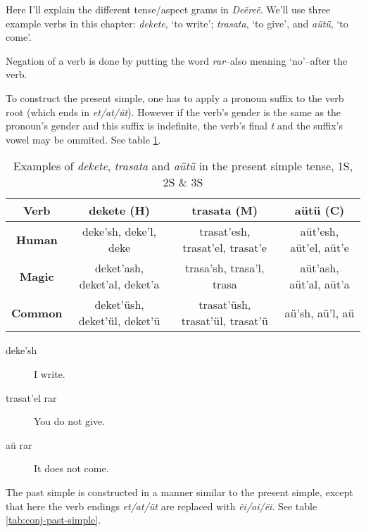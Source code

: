 Here I’ll explain the different tense/aspect grams in \emph{Deẽreẽ}. We’ll use three example verbs in this chapter: \emph{dekete}, ‘to write’; \emph{trasata}, ‘to give’, and \emph{aütü}, ‘to come’.

Negation of a verb is done by putting the word \emph{rar}–also meaning ‘no’–after the verb.

To construct the present simple, one has to apply a pronoun suffix to the verb root (which ends in \emph{et/at/üt}).
However if the verb’s gender is the same as the pronoun’s gender and this suffix is indefinite,
the verb’s final \emph{t} and the suffix’s vowel may be ommited.
See table \ref{tab:conj-present-simple}.

\begin{table}[h]
\begin{center}
\begin{tabular}{|c|c|c|c|}\hline

\textbf{Verb}   & dekete (H) & trasata (M) & aütü (C) \\\hline
\textbf{Human}  & deke’sh, deke’l, deke & trasat’esh, trasat’el, trasat’e & aüt’esh, aüt’el, aüt’e \\\hline
\textbf{Magic}  & deket’ash, deket’al, deket’a & trasa’sh, trasa’l, trasa & aüt’ash, aüt’al, aüt’a \\\hline
\textbf{Common} & deket’üsh, deket’ül, deket’ü & trasat’üsh, trasat’ül, trasat’ü & aü’sh, aü’l, aü \\\hline

\end{tabular}
\end{center}
\caption{Examples of \emph{dekete}, \emph{trasata} and \emph{aütü} in the present simple tense, 1S, 2S \& 3S}
\label{tab:conj-present-simple}
\end{table}

\begin{description}
\item[deke’sh] I write.
\item[trasat’el rar] You do not give.
\item[aü rar] It does not come.
\end{description}

The past simple is constructed in a manner similar to the present simple, except that here the verb endings \emph{et/at/üt}
are replaced with \emph{ẽi/oi/ëi}.
See table \ref{tab:conj-past-simple}.

